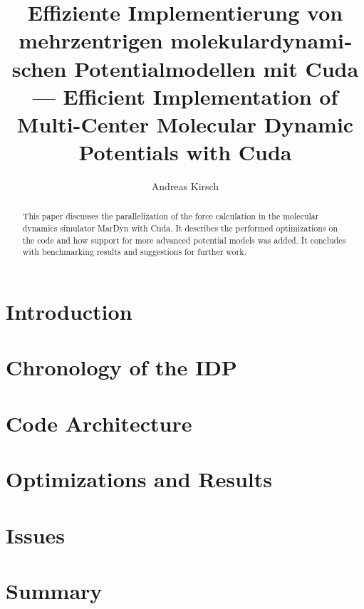 \documentclass[11pt,a4paper,onecolumn,notitlepage]{elsarticle}
\author{Andreas Kirsch}
\title{\foreignlanguage{ngerman}{Effiziente Implementierung von mehrzentrigen molekulardynamischen Potentialmodellen mit Cuda} \linebreak --- \linebreak Efficient Implementation of Multi-Center Molecular Dynamic Potentials with Cuda}
\newcommand{\cuda}{Cuda}
\begin{document}
\begin{abstract}
This paper discusses the parallelization of the force calculation in the molecular dynamics simulator MarDyn with \cuda. It describes the performed optimizations on the code and how support for more advanced potential models was added. It concludes with benchmarking results and suggestions for further work.
\end{abstract}

\maketitle

\section{Introduction}



\section{Chronology of the IDP}



\section{Code Architecture}

\section{Optimizations and Results}

\section{Issues}

\section{Summary}
\end{document}
